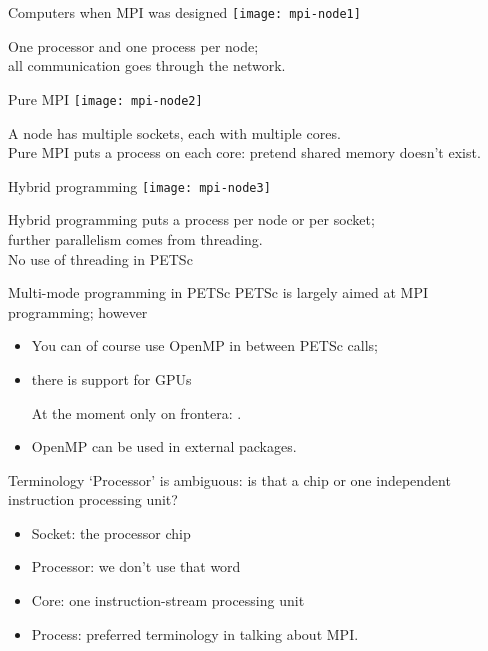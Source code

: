 

\begin{numberedframe}{Computers when MPI was designed}
  \texttt{[image: mpi-node1]}

  One processor and one  process per node;\\
  all communication goes through the network.
\end{numberedframe}

\begin{numberedframe}{Pure MPI}
  \texttt{[image: mpi-node2]}

  A node has multiple sockets, each with multiple cores.\\
  Pure MPI puts a process on each core: pretend shared memory doesn't exist.
\end{numberedframe}

\begin{numberedframe}{Hybrid programming}
  \texttt{[image: mpi-node3]}

  Hybrid programming puts a process per node or per socket;\\
  further parallelism comes from threading.\\
  No use of threading in PETSc
\end{numberedframe}

\begin{numberedframe}{Multi-mode programming in PETSc}
  PETSc is largely aimed at MPI programming; however
  \begin{itemize}
  \item You can of course use OpenMP in between PETSc calls;
  \item there is support for GPUs
\begin{taccnote}
At the moment only on frontera: .
\end{taccnote}
  \item OpenMP can be used in external packages.
  \end{itemize}
\end{numberedframe}

\begin{numberedframe}{Terminology}
  `Processor' is ambiguous: is that a chip or one independent
  instruction processing unit?
  \begin{itemize}
  \item Socket: the processor chip
  \item Processor: we don't use that word
  \item Core: one instruction-stream processing unit
  \item Process: preferred terminology in talking about MPI.
  \end{itemize}  
\end{numberedframe}

